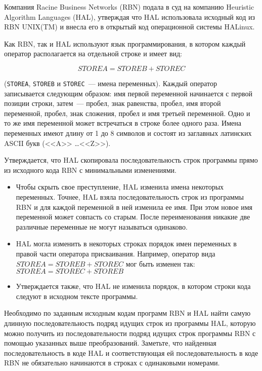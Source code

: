 Компания Racine Business Networks (RBN) подала в суд на компанию Heuristic 
Algorithm Languages (HAL), утверждая что HAL использовала исходный код из
RBN UNIX(TM) и внесла его в открытый код операционной системы HALinux. 

Как RBN, так и HAL используют язык программирования, в котором каждый
оператор располагается на отдельной строке и имеет вид: 

$$ STOREA = STOREB + STOREC $$

(\texttt{STOREA}, \texttt{STOREB} и \texttt{STOREC}~--- имена переменных). Каждый оператор
записывается следующим образом: имя первой переменной начинается с первой
позиции строки, затем~--- пробел, знак равенства, пробел, имя второй переменной, 
пробел, знак сложения, пробел и имя третьей переменной. Одно и то же имя
переменной может встречаться в строке более одного раза. Имена переменных 
имеют длину от 1 до 8 символов и состоят из заглавных латинских ASCII букв
(<<A>> \ldots <<Z>>). 

Утверждается, что HAL скопировала последовательность строк программы прямо
из исходного кода RBN с минимальными изменениями. 
\begin{itemize}
\item Чтобы скрыть свое преступление, HAL изменила имена некоторых
переменных. Точнее, HAL взяла последовательность строк из программы
RBN и для каждой переменной в ней изменила ее имя. При этом новое имя
переменной может совпасть со старым. После переименования никакие две
различные переменные не могут называться одинаково. 
\item HAL могла изменить в некоторых строках порядок имен переменных в
правой части оператора присваивания. Например, оператор вида
$STOREA = STOREB + STOREC$ 
мог быть изменен так: 
$STOREA = STOREC + STOREB$
\item Утверждается также, что HAL не изменила порядок, в котором строки кода
следуют в исходном тексте программы. 
\end{itemize}

Необходимо по заданным исходным кодам программ RBN и HAL найти самую
длинную последовательность подряд идущих строк из программы HAL, которую
можно получить из последовательности подряд идущих строк программы RBN с
помощью указанных выше преобразований. Заметьте, что найденная
последовательность в коде HAL и соответствующая ей последовательность в коде
RBN не обязательно начинаются в строках с одинаковыми номерами. 